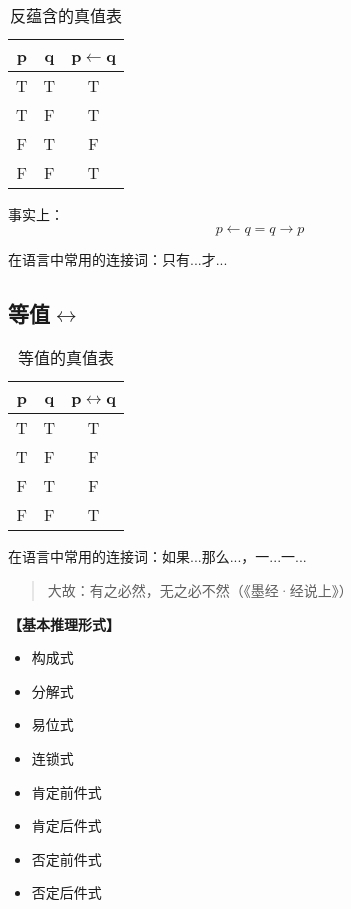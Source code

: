 \documentclass[12pt,onecolumn,a4paper]{book}
\numberwithin{table}{subsection}
\numberwithin{equation}{subsection}
\begin{document}
\begin{table}[h]
    \centering
    \setlength{\tabcolsep}{5mm}
    \begin{tabular}{ccc}
        \toprule
        p & q & p$\leftarrow$q \\ 
        \midrule
        T & T & T\\
        T & F & T\\
        F & T & F\\
        F & F & T\\
        \bottomrule
    \end{tabular}
    \caption{反蕴含的真值表}
\end{table}

事实上：
\begin{equation}
    p \leftarrow q = q \rightarrow p
\end{equation}

在语言中常用的连接词：只有...才...

\newpage

\subsection{等值$\leftrightarrow$}

\begin{table}[h]
    \centering
    \setlength{\tabcolsep}{5mm}
    \begin{tabular}{ccc}
        \toprule
        p & q & p$\leftrightarrow$q \\ 
        \midrule
        T & T & T\\
        T & F & F\\
        F & T & F\\
        F & F & T\\
        \bottomrule
    \end{tabular}
    \caption{等值的真值表}
\end{table}

在语言中常用的连接词：如果...那么...，一...一...

\begin{quotation}
    大故：有之必然，无之必不然（《墨经·经说上》）
\end{quotation}

\textbf{【基本推理形式】}

\begin{itemize}[itemsep=0pt,parsep=0pt]
    \item 构成式
    \item 分解式
    \item 易位式
    \item 连锁式
    \item 肯定前件式
    \item 肯定后件式
    \item 否定前件式
    \item 否定后件式
\end{itemize}
\end{document}
